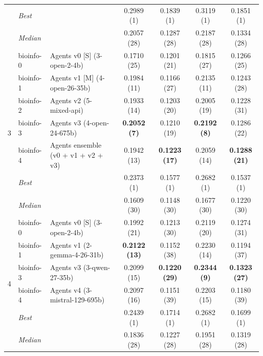\begin{table}[ht]
\begin{tabular}{cl|l|cccc}
    & \textit{Best} & \multicolumn{1}{l|}{} & 0.2989 (1) & 0.1839 (1) & 0.3119 (1) & 0.1851 (1) \\
    & \textit{Median}& \multicolumn{1}{l|}{} & 0.2057 (28) & 0.1287 (28) & 0.2187 (28) & 0.1334 (28) \\
    \midrule
    \multirow{7}{*}{3}
    & bioinfo-0 & Agents v0 [S] (3-open-2-4b) & 0.1710 (25) & 0.1201 (21) & 0.1815 (27) & 0.1266 (25) \\
    & bioinfo-1 & Agents v1 [M] (4-open-26-35b) & 0.1984 (11) & 0.1166 (27) & 0.2135 (11) & 0.1243 (28) \\
    & bioinfo-2 & Agents v2 (5-mixed-api) & 0.1933 (14) & 0.1203 (20) & 0.2005 (19) & 0.1228 (31) \\
    & bioinfo-3 & Agents v3 (4-open-24-675b) & \textbf{0.2052 (7)} & 0.1210 (19) & \textbf{0.2192 (8)} & 0.1286 (22) \\
    & bioinfo-4 & Agents ensemble (v0 + v1 + v2 + v3) & 0.1942 (13) & \textbf{0.1223 (17)} & 0.2059 (14) & \textbf{0.1288 (21)} \\
    \cmidrule(l){2-7}
    & \textit{Best} & \multicolumn{1}{l|}{} & 0.2373 (1) & 0.1577 (1) & 0.2682 (1) & 0.1537 (1) \\
    & \textit{Median}& \multicolumn{1}{l|}{} & 0.1609 (30) & 0.1148 (30) & 0.1677 (30) & 0.1220 (30) \\
    \midrule
    \multirow{6}{*}{4}
    & bioinfo-0 & Agents v0 [S] (3-open-2-4b) & 0.1992 (21) & 0.1213 (30) & 0.2119 (20) & 0.1274 (31) \\
    & bioinfo-1 & Agents v1 (2-gemma-4-26-31b) & \textbf{0.2122 (13)} & 0.1152 (38) & 0.2230 (14) & 0.1194 (37) \\
    & bioinfo-3 & Agents v3 (3-qwen-27-35b) & 0.2099 (15) & \textbf{0.1220 (29)} & \textbf{0.2344 (9)} & \textbf{0.1323 (27)} \\
    & bioinfo-4 & Agents v4 (3-mistral-129-695b) & 0.2097 (16) & 0.1151 (39) & 0.2203 (15) & 0.1180 (39) \\
    \cmidrule(l){2-7}
    & \textit{Best} & \multicolumn{1}{l|}{} & 0.2439 (1) & 0.1714 (1) & 0.2682 (1) & 0.1699 (1) \\
    & \textit{Median}& \multicolumn{1}{l|}{} & 0.1836 (28) & 0.1227 (28) & 0.1951 (28) & 0.1319 (28) \\
    \bottomrule
  \end{tabular}
\end{table}

